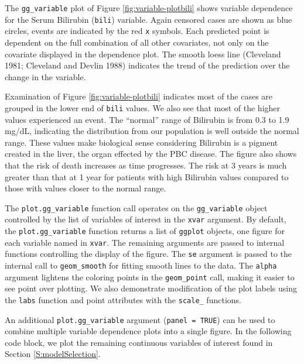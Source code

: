 \documentclass[article, nojss]{jss}
\begin{document}
The \texttt{gg\_variable} plot of Figure \ref{fig:variable-plotbili}
shows variable dependence for the Serum Bilirubin (\texttt{bili})
variable. Again censored cases are shown as blue circles, events are
indicated by the red \texttt{x} symbols. Each predicted point is
dependent on the full combination of all other covariates, not only on
the covariate displayed in the dependence plot. The smooth loess line
(Cleveland 1981; Cleveland and Devlin 1988) indicates the trend of the
prediction over the change in the variable.

Examination of Figure \ref{fig:variable-plotbili} indicates most of the
cases are grouped in the lower end of \texttt{bili} values. We also see
that most of the higher values experienced an event. The ``normal''
range of Bilirubin is from 0.3 to 1.9 mg/dL, indicating the distribution
from our population is well outside the normal range. These values make
biological sense considering Bilirubin is a pigment created in the
liver, the organ effected by the PBC disease. The figure also shows that
the risk of death increases as time progresses. The risk at 3 years is
much greater than that at 1 year for patients with high Bilirubin values
compared to those with values closer to the normal range.

The \texttt{plot.gg\_variable} function call operates on the
\texttt{gg\_variable} object controlled by the list of variables of
interest in the \texttt{xvar} argument. By default, the
\texttt{plot.gg\_variable} function returns a list of \texttt{ggplot}
objects, one figure for each variable named in \texttt{xvar}. The
remaining arguments are passed to internal  functions
controlling the display of the figure. The \texttt{se} argument is
passed to the internal call to \texttt{geom\_smooth} for fitting smooth
lines to the data. The \texttt{alpha} argument lightens the coloring
points in the \texttt{geom\_point} call, making it easier to see point
over plotting. We also demonstrate modification of the plot labels using
the \texttt{labs} function and point attributes with the
\texttt{scale\_} functions.

An additional \texttt{plot.gg\_variable} argument
(\texttt{panel\ =\ TRUE}) can be used to combine multiple variable
dependence plots into a single figure. In the following code block, we
plot the remaining continuous variables of interest found in Section
\ref{S:modelSelection}.
\end{document}
